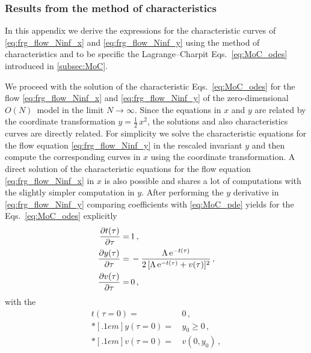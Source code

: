 \subsubsection{Results from the method of characteristics}
\label{app:method_of_characteristics}
In this appendix we derive the expressions for the characteristic curves of \cref{eq:frg_flow_Ninf_x} and \eqref{eq:frg_flow_Ninf_y} using the method of characteristics and to be specific the Lagrange–Charpit Eqs.~\eqref{eq:MoC_odes} introduced in \cref{subsec:MoC}.

We proceed with the solution of the characteristic Eqs.~\eqref{eq:MoC_odes} for the \frg{} flow \cref{eq:frg_flow_Ninf_x} and \eqref{eq:frg_flow_Ninf_y} of the zero-dimensional $O(N)$~model in the limit $N \rightarrow \infty$.
Since the equations in $x$ and $y$ are related by the coordinate transformation ${y = \tfrac{1}{2} \, x^2}$, the solutions and also characteristics curves are directly related.
For simplicity we solve the characteristic equations for the flow equation \eqref{eq:frg_flow_Ninf_y} in the rescaled invariant $y$ and then compute the corresponding curves in $x$ using the coordinate transformation.
A direct solution of the characteristic equations for the flow equation \eqref{eq:frg_flow_Ninf_x} in $x$ is also possible and shares a lot of computations with the slightly simpler computation in $y$.
After performing the $y$ derivative in \cref{eq:frg_flow_Ninf_y} comparing coefficients with \cref{eq:MoC_pde} yields for the Eqs.~\eqref{eq:MoC_odes} explicitly
\begin{subequations}\label{eq:MoC_ode_y}
\begin{align}	
	\frac{\partial t ( \tau )}{\partial \tau} = \, & 1 \,,	\label{eq:MoC_ode_y_1}
	\\* %
	\frac{\partial y ( \tau )}{\partial \tau} = \, & - \frac{\Lambda \, \eu^{- t ( \tau )}}{2 \, [ \Lambda \, \eu^{- t ( \tau )} + v ( \tau ) ]^2} \, ,	\label{eq:MoC_ode_y_2}
	\\* %
	\frac{\partial v ( \tau )}{\partial \tau} = \, & 0 \, ,	\label{eq:MoC_ode_y_3}
\end{align}
\end{subequations}
with the \uv{} \ics{}
\begin{subequations}
\begin{align}
	t ( \tau = 0 ) = \, & 0 \, ,\\*[.1em] %
	y ( \tau = 0 ) = \, & y_0 \geq 0 \, ,\\*[.1em] %
	v ( \tau = 0 ) = \, & v ( 0, y_0 ) \, ,
\end{align}
\end{subequations}
